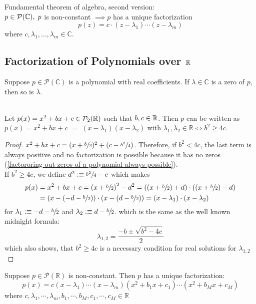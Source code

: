 \begin{thm}
  \label{fundamental-theorem-of-algebra-second-version}
  Fundamental theorem of algebra, second version: \\
  $p \in \mathcal{P}(\mathbb{C}), \; p$ is non-constant $\implies p$ has a unique factorization
  $$p(z)=c \cdot (z-\lambda_1) \cdots (z-\lambda_m)$$ where $c, \lambda_1, \dots, \lambda_m \in \mathbb{C}$.
\end{thm}

\subsection{Factorization of Polynomials over $\mathbb{R}$}
\begin{thm}
  Suppose $p\in \mathcal{P} (\mathbb{C})$ is a polynomial with real coefficients. If $\lambda \in \mathbb{C}$ is a zero of $p$, then so is $\overline{\lambda}$.
\end{thm}

\begin{thm}
   \\
  Let $p(x)=x^2+bx+c \in \mathcal{P}_2(\mathbb{R})$ such that $b,c \in \mathbb{R}$. Then $p$ can be written as
  $p(x)=x^2 + bx + c$ $=$ $(x-\lambda_1)(x-\lambda_2)$ with $\lambda_1, \lambda_2 \in \mathbb{R} \iff b^2 \geq 4c$.
\end{thm}
\begin{proof}
  $x^2+bx+c=(x+\sfrac{b}{2})^2+(c-\sfrac{b^2}{4})$. Therefore, if $b^2<4c$, the last term is always positive and no factorization is possible because it has no zeros (\ref{factororing-out-zeros-of-a-polynomial-always-possible}). \\
  If $b^2 \geq 4c$, we define $d^2 :\equiv \sfrac{b^2}{4}-c$ which makes
  \begin{equation}
  \begin{aligned}
    p(x)&=x^2+bx+c
  = \left (x+\sfrac{b}{2} \right )^2-d^2
  = \left ( (x+\sfrac{b}{2}) +d \right) \cdot \left ( (x+\sfrac{b}{2}) - d \right) \\
  &= \left (x-(-d -\sfrac{b}{2}) \right) \cdot \left (x-(d-\sfrac{b}{2})\right)
  =\left(x-\lambda_1 \right) \cdot \left(x-\lambda_2\right)
  \end{aligned}
  \end{equation}
  for $\lambda_1 :\equiv -d-\sfrac{b}{2}$ and $\lambda_2 :\equiv d-\sfrac{b}{2}$.
  which is the same as the well known midnight formula:
  \begin{equation}
    \lambda_{1,2} = \frac{-b \pm \sqrt{b^2-4c}}{2}
  \end{equation}
  which also shows, that $b^2 \geq 4c$ is a necessary condition for real solutions for $\lambda_{1,2}$
\end{proof}

\begin{thm}
  Suppose $p \in \mathcal{P}(\mathbb{R})$ is non-constant. Then $p$ has a unique factorization:
  \begin{equation}
    p(x) = c(x-\lambda_1) \cdots (x-\lambda_m)(x^2+b_1x+c_1) \cdots (x^2+b_Mx+c_M)
  \end{equation}
  where $c, \lambda_1, \cdots, \lambda_m, b_1, \cdots, b_M, c_1, \cdots, c_M \in \mathbb{R}$
\end{thm}
